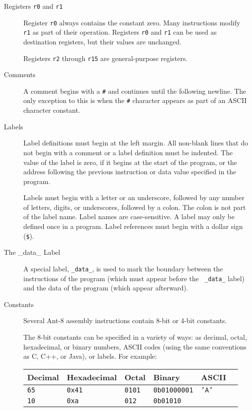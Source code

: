 \documentclass[10pt]{report}
\begin{document}
\begin{description}
\item[Registers {\tt r0} and {\tt r1}]

Register {\tt r0} always contains the constant zero.  Many
instructions modify {\tt r1} as part of their operation.  Registers
{\tt r0} and {\tt r1} can be used as destination registers, but their
values are unchanged.

Registers {\tt r2} through {\tt r15} are general-purpose registers.

\item[Comments]

A comment begins with a \verb$#$ and continues until the following
newline.  The only exception to this is when the \verb$#$ character
appears as part of an ASCII character constant.

\item[Labels]

Label definitions must begin at the left margin.  All non-blank lines
that do not begin with a comment or a label definition must be
indented.  The value of the label is zero, if it begins at the start
of the program, or the address following the previous 
instruction or data value specified in the program.

Labels must begin with a letter or an underscore, followed by any
number of letters, digits, or underscores, followed by a colon.  The
colon is not part of the label name.  Label names are case-sensitive. 
A label may only be defined once in a program.  Label references must
begin with a dollar sign (\verb|$|).

\item[The \_data\_ Label]

A special label, {\tt \_data\_}, is used to mark the boundary between
the instructions of the program (which must appear before the {\tt
\_data\_} label) and the data of the program (which appear afterward).

\item[Constants]

Several {\sc Ant-8} assembly instructions contain 8-bit or 4-bit constants.

The 8-bit constants can be specified in a variety of ways:  as
decimal, octal, hexadecimal, or binary numbers, {\sc ASCII} codes
(using the same conventions as C, C++, or Java), or labels.  For
example:

\begin{center}
\begin{tabular}{|l|l|l|l|l|l|}
\hline
Decimal	& Hexadecimal	& Octal		& Binary	& {\sc ASCII} \\
\hline
{\tt 65} & {\tt 0x41} 	& {\tt 0101}	& {\tt 0b01000001} & {\tt 'A' } \\
{\tt 10} & {\tt 0xa} 	& {\tt 012}	& {\tt 0b01010} & {\tt '\verb$\$n' } \\
\hline
\end{tabular}
\end{center}


\end{description}
\end{document}
